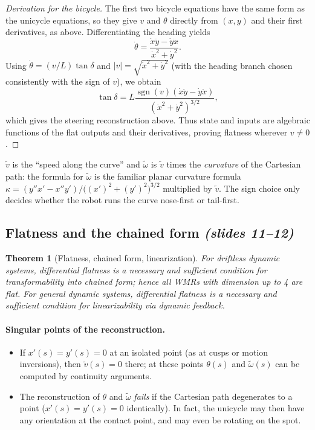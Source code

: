 \documentclass[11pt,a4paper]{article}
\newcommand{\vt}{\tilde v}
\newcommand{\wt}{\tilde\omega}
\theoremstyle{definition}
\theoremstyle{plain}
\newtheorem{theorem}[definition]{Theorem}
\theoremstyle{remark}
\begin{document}
\begin{proof}[Derivation for the bicycle]
The first two bicycle equations have the same form as the unicycle equations, so they give $v$ and $\theta$ directly
from $(x,y)$ and their first derivatives, as above. Differentiating the heading yields
\[
\dot\theta=\frac{\dot x\ddot y-\dot y\ddot x}{\dot x^2+\dot y^2}.
\]
Using $\dot\theta=(v/L)\tan\delta$ and $|v|=\sqrt{\dot x^2+\dot y^2}$ (with the heading branch chosen consistently
with the sign of $v$), we obtain
\[
\tan\delta=L\frac{\operatorname{sgn}(v)(\dot x\ddot y-\dot y\ddot x)}
                         {(\dot x^2+\dot y^2)^{3/2}},
\]
which gives the steering reconstruction above. Thus state and inputs are algebraic functions of the flat outputs and
their derivatives, proving flatness wherever $v\ne0$. \qedhere
\end{proof}

\begin{intuition}
$\vt$ is the ``speed along the curve'' and $\wt$ is $\vt$ times the \emph{curvature} of the Cartesian path: the formula for
$\wt$ is the familiar planar curvature formula $\kappa=(y''x'-x''y')/\big((x')^2+(y')^2\big)^{3/2}$ multiplied by $\vt$.
The sign choice only decides whether the robot runs the curve nose-first or tail-first.
\end{intuition}

\subsection{Flatness and the chained form \emph{(slides 11--12)}}

\begin{theorem}[Flatness, chained form, linearization]\label{thm:flat}
For driftless dynamic systems, differential flatness is a necessary and sufficient condition for transformability into
chained form; hence all WMRs with dimension up to 4 are flat. For general dynamic systems, differential flatness is a
necessary and sufficient condition for linearizability via dynamic feedback.
\end{theorem}

\paragraph{Singular points of the reconstruction.}
\begin{itemize}[nosep]
\item If $x'(s)=y'(s)=0$ at an isolated point (as at cusps or motion inversions), then $\vt(s)=0$ there; at these points $\theta(s)$ and $\wt(s)$ can be computed by continuity arguments.
\item The reconstruction of $\theta$ and $\wt$ \emph{fails} if the Cartesian path degenerates to a point ($x'(s)=y'(s)=0$ identically). In fact, the unicycle may then have any orientation at the contact point, and may even be rotating on the spot.
\end{itemize}
\end{document}
